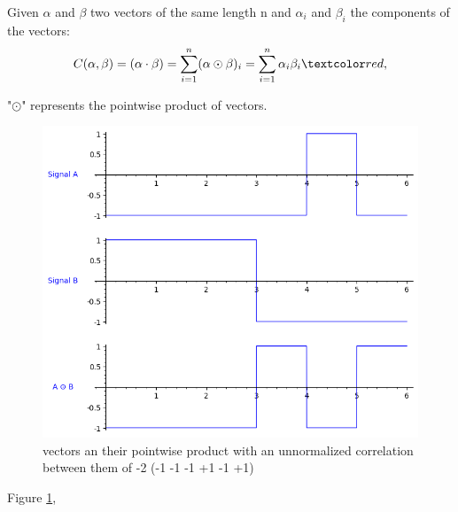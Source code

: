 \begin{definition}\label{def:2}
  Given $\alpha$ and $\beta$ two vectors of the same length n and $\alpha_{i}$
  and $\beta_{i}$ the components of the vectors:
  \begin{equation}\label{eq:2}
    C(\alpha , \beta) = (\alpha \cdot  \beta) = \sum_{i=1}^n(\alpha \odot \beta)_{i}= \sum_{i=1}^{n} \alpha_{i}\beta_{i}\domingo{,}
  \end{equation}

   "$\odot$" represents the pointwise product of vectors.

\end{definition}


\begin{figure}[ht!] %
\begin{center}
\includegraphics[width=0.7\linewidth]{Chapters/Introduction/signals_correlation}
\end{center}
\caption{ vectors an their pointwise product with an unnormalized correlation between them of -2 (-1 -1 -1 +1 -1 +1)}
\label{introduction_signals_hadamard}
\end{figure}

Figure \ref{introduction_signals_hadamard}, 










